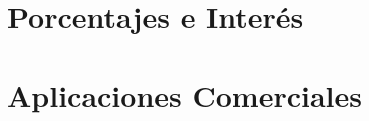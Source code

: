\documentclass[12pt,a4paper,twoside]{book}
\begin{document}
	
	
	
	
	\chapter{Porcentajes e Inter\'{e}s}
	
	
	
	
	
	
	\chapter{Aplicaciones Comerciales}
	
	
	
	
\end{document}
